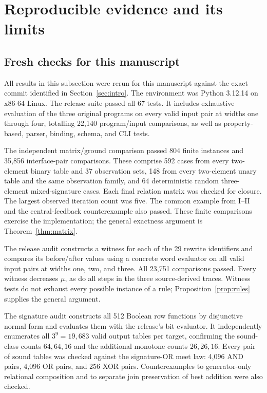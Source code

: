 \section{Reproducible evidence and its limits}\label{sec:experiments}

\subsection{Fresh checks for this manuscript}
All results in this subsection were rerun for this manuscript against the exact commit identified in Section~\ref{sec:intro}. The environment was Python 3.12.14 on x86-64 Linux. The release suite passed all 67 tests. It includes exhaustive evaluation of the three original programs on every valid input pair at widths one through four, totalling 22,140 program/input comparisons, as well as property-based, parser, binding, schema, and CLI tests.

The independent matrix/ground comparison passed 804 finite instances and 35,856 interface-pair comparisons. These comprise 592 cases from every two-element binary table and 37 observation sets, 148 from every two-element unary table and the same observation family, and 64 deterministic random three-element mixed-signature cases. Each final relation matrix was checked for closure. The largest observed iteration count was five. The common example from I--II and the central-feedback counterexample also passed. These finite comparisons exercise the implementation; the general exactness argument is Theorem~\ref{thm:matrix}.

The release audit constructs a witness for each of the 29 rewrite identifiers and compares its before/after values using a concrete word evaluator on all valid input pairs at widths one, two, and three. All 23,751 comparisons passed. Every witness decreases $\mu$, as do all steps in the three source-derived traces. Witness tests do not exhaust every possible instance of a rule; Proposition~\ref{prop:rules} supplies the general argument.

The signature audit constructs all 512 Boolean row functions by disjunctive normal form and evaluates them with the release's bit evaluator. It independently enumerates all $3^9=19,683$ valid output tables per target, confirming the sound-class counts $64,64,16$ and the additional monotone counts $26,26,16$. Every pair of sound tables was checked against the signature-OR meet law: 4,096 AND pairs, 4,096 OR pairs, and 256 XOR pairs. Counterexamples to generator-only relational composition and to separate join preservation of best addition were also checked.


